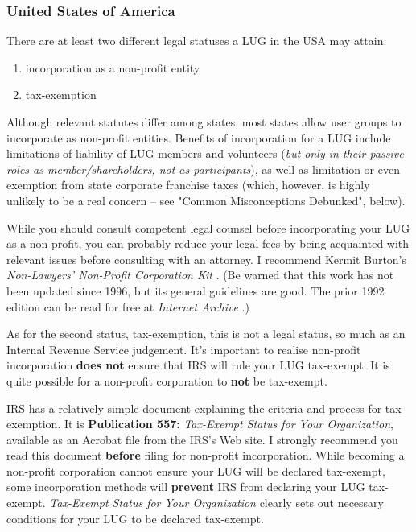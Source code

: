 \documentclass{HOWTO}
\begin{document}
\subsubsection{United States of America}

There are at least two different legal statuses a LUG in the USA may
attain:

\begin{enumerate}
\item incorporation as a non-profit entity
\item tax-exemption
\end{enumerate}


Although relevant statutes differ among states, most states
allow user groups to incorporate as non-profit entities. Benefits
of incorporation for a LUG include limitations of liability
of LUG members and volunteers ({\itshape but only in their passive roles
as member/shareholders, not as participants\/}), as well as 
limitation or even exemption from state corporate franchise taxes
(which, however, is highly unlikely to be a real concern -- see 
"Common Misconceptions Debunked", below).

While you should consult competent legal counsel before incorporating
your LUG as a non-profit, you can probably reduce your legal
fees by being acquainted with relevant issues before consulting
with an attorney. I recommend Kermit Burton's {\itshape 
\emph{Non-Lawyers' Non-Profit Corporation Kit} \texttt{\aelurl}
\/}.  (Be warned that this work has not been
updated since 1996, but its general guidelines are good.  The prior
1992 edition can be read for free at {\itshape 
\emph{Internet Archive} \texttt{\aemurl}
\/}.)

As for the second status, tax-exemption, this is not a legal status, so
much as an Internal Revenue Service judgement.  It's important to realise
non-profit incorporation {\bfseries does not} ensure that IRS will rule
your LUG tax-exempt.  It is quite possible for a non-profit corporation
to {\bfseries not} be tax-exempt.

IRS has a relatively simple document explaining the criteria
and process for tax-exemption. It is {\bfseries Publication 557:} {\itshape Tax-Exempt Status for Your Organization\/}, available as
an Acrobat file from the IRS's Web site. I strongly recommend
you read this document {\bfseries before} filing for non-profit incorporation.
While becoming a non-profit corporation cannot
ensure your LUG will be declared tax-exempt, some
incorporation methods will {\bfseries prevent} IRS from declaring your
LUG tax-exempt. {\itshape Tax-Exempt Status for Your Organization\/} clearly sets out necessary conditions for your LUG to be declared
tax-exempt.
\end{document}
